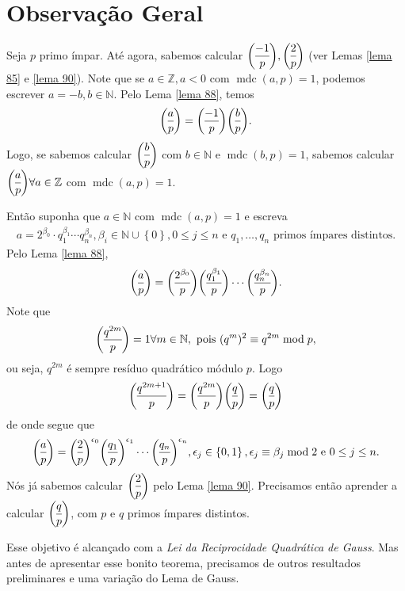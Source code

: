 \documentclass[a4paper,11pt,twoside, leqno]{article}
\DeclareMathOperator{\mdc}{mdc}
\newcommand{\genlegendre}[4]{%
	\genfrac{(}{)}{}{#1}{#3}{#4}%
	\if\relax\detokenize{#2}\relax\else_{\!#2}\fi
}
\newcommand{\legendre}[3][]{\genlegendre{}{#1}{#2}{#3}}
\theoremstyle{definition}
\begin{document}
\section{Observação Geral}
\hspace{12pt} Seja $p$ primo ímpar. Até agora, sabemos calcular $\displaystyle{ \legendre[]{-1}{p}, \legendre[]{2}{p} }$ (ver Lemas \eqref{lema 85} e \eqref{lema 90}). Note que se $a\in\mathbb{Z}, a<0$ com $\mdc(a,p) = 1$, podemos escrever $a=-b,b\in\mathbb{N}$. Pelo Lema \eqref{lema 88}, temos
\begin{align*}
\legendre[]{a}{p} = \legendre[]{-1}{p}\legendre[]{b}{p}.
\end{align*}
Logo, se sabemos calcular $\displaystyle{ \legendre[]{b}{p} }$ com $b\in\mathbb{N}$ e $\mdc(b,p) = 1$, sabemos calcular $\displaystyle{ \legendre[]{a}{p} \forall a\in\mathbb{Z} }$ com $\mdc(a,p) = 1$. 
\par\vspace{0.3cm} Então suponha que $a\in\mathbb{N}$ com $\mdc(a,p) = 1$ e escreva
\begin{align*}
a = 2^{\beta_0}\cdot q_1^{\beta_1}\cdots q_n^{\beta_n}, \beta_i\in\mathbb{N}\cup\left\{0\right\}, 0\leq j\leq n \text{ e } q_1, \dots, q_n \text{ primos ímpares distintos.}
\end{align*}
Pelo Lema \eqref{lema 88},
\begin{align*}
\legendre[]{a}{p} = \legendre[]{2^{\beta_0}}{p}\legendre[]{q_1^{\beta_1}}{p}\cdots\legendre[]{q_n^{\beta_n}}{p}.
\end{align*}
Note que 
\begin{align*}
\legendre[]{q^{2m}}{p} = 1\forall m\in\mathbb{N}, \text{ pois } (q^m)^2\equiv q^{2m}\bmod p,
\end{align*}
ou seja, $q^{2m}$ é sempre resíduo quadrático módulo $p$. Logo
\begin{align*}
\legendre[]{q^{2m+1}}{p} = \legendre[]{q^{2m}}{p}\legendre[]{q}{p} = \legendre[]{q}{p}
\end{align*}
de onde segue que
\begin{align*}
\legendre[]{a}{p} = \legendre[]{2}{p}^{\epsilon_0}\legendre[]{q_1}{p}^{\epsilon_1}\cdots\legendre[]{q_n}{p}^{\epsilon_n}, \epsilon_j\in\left\{0,1\right\}, \epsilon_j\equiv \beta_j\bmod 2 \text{ e } 0\leq j\leq n.
\end{align*}
Nós já sabemos calcular $\displaystyle{\legendre[]{2}{p}}$ pelo Lema \eqref{lema 90}. Precisamos então aprender a calcular $\displaystyle{\legendre[]{q}{p}}$, com $p$ e $q$ primos ímpares distintos. 
\par\vspace{0.3cm} Esse objetivo é alcançado com a {\em Lei da Reciprocidade Quadrática de Gauss}. Mas antes de apresentar esse bonito teorema, precisamos de outros resultados preliminares e uma variação do Lema de Gauss.
\end{document}
